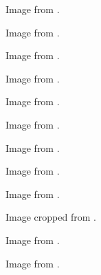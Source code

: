 	\begin{minipage}{\textwidth}
		Image from \cite{lettuce}.
	\end{minipage}

	\begin{minipage}{\textwidth}
		Image from \cite{mayonnaise}.
	\end{minipage}

	\begin{minipage}{\textwidth}
		Image from \cite{mustard}.
	\end{minipage}

	\begin{minipage}{\textwidth}
		Image from \cite{ketchup}.
	\end{minipage}

	\begin{minipage}{\textwidth}
		Image from \cite{carrot}.
	\end{minipage}

	\begin{minipage}{\textwidth}
		Image from \cite{peanutButter}.
	\end{minipage}

	\begin{minipage}{\textwidth}
		Image from \cite{jelly}.
	\end{minipage}

	\begin{minipage}{\textwidth}
		Image from \cite{olives}.
	\end{minipage}

	\begin{minipage}{\textwidth}
		Image from \cite{fish}.
	\end{minipage}

	\begin{minipage}{\textwidth}
		Image cropped from \cite{egg}.
	\end{minipage}

	\begin{minipage}{\textwidth}
		Image from \cite{fruit}.
	\end{minipage}

	\begin{minipage}{\textwidth}
		Image from \cite{chickenFoot}.
	\end{minipage}

